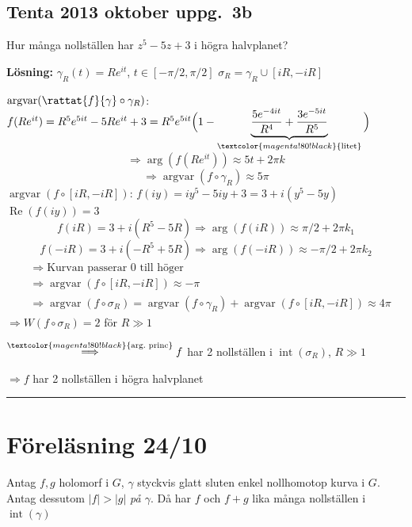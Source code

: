 \subsection{Tenta 2013 oktober uppg.\ 3b}
Hur många nollställen har $z^5 - 5z + 3$ i högra halvplanet?

\textbf{Lösning:}
$\gamma_R(t) = Re^{it}$, $t \in [-\pi/2, \pi/2]$ \qquad $\sigma_R = \gamma_R \cup [iR, -iR]$

\emph{$\operatorname{argvar}(\rattat{f}{\gamma} \circ \gamma_R)$}: \quad $f(Re^{it}) = R^5 e^{5it} - 5Re^{it} + 3 = R^5 e^{5it}\Big( 1 - \underbrace{\dfrac{5e^{-4it}}{R^4} + \dfrac{3e^{-5it}}{R^5}}_{\textcolor{magenta!80!black}{\text{litet}}} \Big)$
\[ \Rightarrow \arg(f(Re^{it})) \approx 5t + 2\pi k \]
\[ \Rightarrow \operatorname{argvar}(f \circ \gamma_R) \approx 5\pi \]
\emph{$\operatorname{argvar}(f \circ [iR, -iR])$}: \quad $f(iy) = iy^5 - 5iy + 3 = 3 + i(y^5 - 5y)$
$\operatorname{Re}(f(iy)) = 3$
\[ f(iR) = 3 + i(R^5 - 5R) \Rightarrow \arg(f(iR)) \approx \pi/2 + 2\pi k_1 \]
\[ f(-iR) = 3 + i(-R^5 + 5R) \Rightarrow \arg(f(-iR)) \approx -\pi/2 + 2\pi k_2 \]
\begin{align*}
  &\Rightarrow \text{Kurvan passerar } 0 \text{ till höger} \\
  &\Rightarrow \operatorname{argvar}(f \circ [iR, -iR]) \approx -\pi \\
  &\Rightarrow \operatorname{argvar}(f \circ \sigma_R) = \operatorname{argvar}(f \circ \gamma_R) + \operatorname{argvar}(f \circ [iR, -iR]) \approx 4\pi
\end{align*}
$\Rightarrow W(f \circ \sigma_R) = 2$ för $R \gg 1$

$\overset{\textcolor{magenta!80!black}{\text{arg.\ princ}}}{\Longrightarrow} f$ har 2 nollställen i $\operatorname{int}(\sigma_R)$, $R \gg 1$

$\Rightarrow f$ har 2 nollställen i högra halvplanet

\noindent\rule{\linewidth}{0.4pt}

\section{Föreläsning 24/10}
\begin{theorem}
Antag $f, g$ holomorf i $G$, $\gamma$ styckvis glatt sluten enkel nollhomotop kurva i $G$. Antag dessutom $|f| > |g|$ \emph{på $\gamma$}. Då har $f$ och $f + g$ lika många nollställen i $\operatorname{int}(\gamma)$
\end{theorem}
